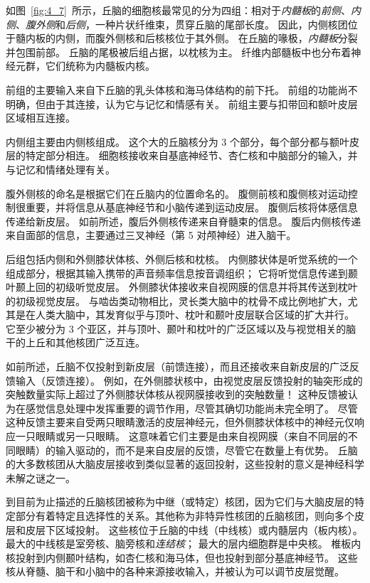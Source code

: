 如图~\ref{fig:4_7}~所示，丘脑的细胞核最常见的分为四组：相对于\textit{内髓板}的\textit{前侧}、\textit{内侧}、\textit{腹外侧}和\textit{后侧}，一种片状纤维束，贯穿丘脑的尾部长度。
因此，内侧核团位于髓内板的内侧，而腹外侧核和后核核位于其外侧。
在丘脑的喙极，\textit{内髓板}分裂并包围前部。
丘脑的尾极被后组占据，以枕核为主。
纤维内部髓板中也分布着神经元群，它们统称为内髓板内核。


前组的主要输入来自下丘脑的乳头体核和海马体结构的前下托。 
前组的功能尚不明确，但由于其连接，认为它与记忆和情感有关。
前组主要与扣带回和额叶皮层区域相互连接。


内侧组主要由内侧核组成。 
这个大的丘脑核分为 3 个部分，每个部分都与额叶皮层的特定部分相连。
细胞核接收来自基底神经节、杏仁核和中脑部分的输入，并与记忆和情绪处理有关。


腹外侧核的命名是根据它们在丘脑内的位置命名的。 
腹侧前核和腹侧核对运动控制很重要，并将信息从基底神经节和小脑传递到运动皮层。
腹侧后核将体感信息传递给新皮层。
如前所述，腹后外侧核传递来自脊髓束的信息。
腹后内侧核传递来自面部的信息，主要通过三叉神经（第 5 对颅神经）进入脑干。


后组包括内侧和外侧膝状体核、外侧后核和枕核。 
内侧膝状体是听觉系统的一个组成部分，根据其输入携带的声音频率信息按音调组织； 它将听觉信息传递到颞叶颞上回的初级听觉皮层。 
外侧膝状体接收来自视网膜的信息并将其传送到枕叶的初级视觉皮层。 
与啮齿类动物相比，灵长类大脑中的枕骨不成比例地扩大，尤其是在人类大脑中，其发育似乎与顶叶、枕叶和颞叶皮层联合区域的扩大并行。
它至少被分为 3 个亚区，并与顶叶、颞叶和枕叶的广泛区域以及与视觉相关的脑干的上丘和其他核团广泛互连。


如前所述，丘脑不仅投射到新皮层（前馈连接），而且还接收来自新皮层的广泛反馈输入（反馈连接）。 
例如，在外侧膝状核中，由视觉皮层反馈投射的轴突形成的突触数量实际上超过了外侧膝状体核从视网膜接收到的突触数量！ 
这种反馈被认为在感觉信息处理中发挥重要的调节作用，尽管其确切功能尚未完全明了。
尽管这种反馈主要来自受两只眼睛激活的皮层神经元，但外侧膝状体核中的神经元仅响应一只眼睛或另一只眼睛。 
这意味着它们主要是由来自视网膜（来自不同层的不同眼睛）的输入驱动的，而不是来自皮层的反馈，尽管它在数量上有优势。 
丘脑的大多数核团从大脑皮层接收到类似显著的返回投射，这些投射的意义是神经科学未解之谜之一。


到目前为止描述的丘脑核团被称为中继（或特定）核团，因为它们与大脑皮层的特定部分有着特定且选择性的关系。其他称为非特异性核团的丘脑核团，则向多个皮层和皮层下区域投射。
这些核位于丘脑的中线（中线核）或内髓层内（板内核）。 
最大的中线核是室旁核、脑旁核和\textit{连结核}；
最大的层内细胞群是中央核。 
椎板内核投射到内侧颞叶结构，如杏仁核和海马体，但也投射到部分基底神经节。
这些核从脊髓、脑干和小脑中的各种来源接收输入，并被认为可以调节皮层觉醒。


